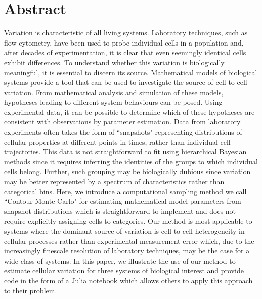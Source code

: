 \documentclass[10pt,letterpaper]{article}
\begin{document}
\newpage
\section{Abstract}
Variation is characteristic of all living systems. Laboratory techniques, such as flow cytometry, have been used to probe individual cells in a population and, after decades of experimentation, it is clear that even seemingly identical cells exhibit differences. To understand whether this variation is biologically meaningful, it is essential to discern its source. Mathematical models of biological systems provide a tool that can be used to investigate the source of cell-to-cell variation. From mathematical analysis and simulation of these models, hypotheses leading to different system behaviours can be posed. Using experimental data, it can be possible to determine which of these hypotheses are consistent with observations by parameter estimation. Data from laboratory experiments often takes the form of ``snapshots" representing distributions of cellular properties at different points in times, rather than individual cell trajectories. This data is not straightforward to fit using hierarchical Bayesian methods since it requires inferring the identities of the groups to which individual cells belong. Further, such grouping may be biologically dubious since variation may be better represented by a spectrum of characteristics rather than categorical bins. Here, we introduce a computational sampling method we call ``Contour Monte Carlo" for estimating mathematical model parameters from snapshot distributions which is straightforward to implement and does not require explicitly assigning cells to categories. Our method is most applicable to systems where the dominant source of variation is cell-to-cell heterogeneity in cellular processes rather than experimental measurement error which, due to the increasingly finescale resolution of laboratory techniques, may be the case for a wide class of systems. In this paper, we illustrate the use of our method to estimate cellular variation for three systems of biological interest and provide code in the form of a Julia notebook which allows others to apply this approach to their problem.
\end{document}

